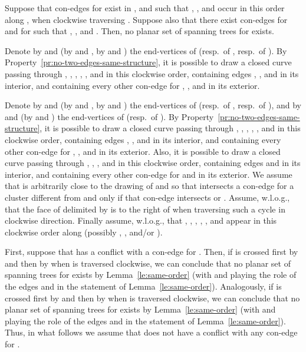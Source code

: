 \documentclass[letter,runningheads]{llncs}
\renewenvironment{proof}
{{\em Proof.\ }}{\hspace*{\fill}\par\vspace{2mm}}
\begin{document}
\begin{lemma}[{\sc Test 4}]\label{le:ababa}
Suppose that con-edges  for  exist in , and such that , , and  occur in this order along , when clockwise traversing . Suppose also that there exist con-edges  for  and  for  such that , , and . Then, no planar set of spanning trees for  exists.
\end{lemma}

\begin{proof}
Denote by  and  (by  and , by  and ) the end-vertices of  (resp.\ of , resp.\ of ). By Property~\ref{pr:no-two-edges-same-structure}, it is possible to draw a closed curve  passing through , , , , , and  in this clockwise order, containing edges , , and  in its interior, and containing every other con-edge for , , and  in its exterior.

Denote by  and  (by  and , by  and ) the end-vertices of  (resp.\ of , resp.\ of ), and by  and  (by  and ) the end-vertices of  (resp.\ of ). By Property~\ref{pr:no-two-edges-same-structure}, it is possible to draw a closed curve  passing through , , , , , and  in this clockwise order, containing edges , , and  in its interior, and containing every other con-edge for , , and  in its exterior. Also, it is possible to draw a closed curve  passing through , , , and  in this clockwise order, containing edges  and  in its interior, and containing every other con-edge for  and  in its exterior. We assume that  is arbitrarily close to the drawing of  and  so that  intersects a con-edge for a cluster different from  and  only if that con-edge intersects  or . Assume, w.l.o.g., that the face of  delimited by  is to the right of  when traversing such a cycle in clockwise direction. Finally assume, w.l.o.g., that , , , , , and  appear in this clockwise order along  (possibly , , and/or ).

First, suppose that  has a conflict with a con-edge  for . Then, if  is crossed first by  and then by  when  is traversed clockwise, we can conclude that no planar set of spanning trees for  exists by Lemma~\ref{le:same-order} (with  and  playing the role of the edges  and  in the statement of Lemma~\ref{le:same-order}). Analogously, if  is crossed first by  and then by  when  is traversed clockwise, we can conclude that no planar set of spanning trees for  exists by Lemma~\ref{le:same-order} (with  and  playing the role of the edges  and  in the statement of Lemma~\ref{le:same-order}). Thus, in what follows we assume that  does not have a conflict with any con-edge for .


\end{proof}
\end{document}
